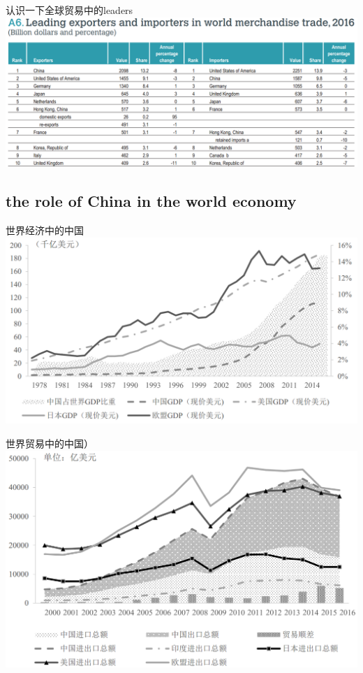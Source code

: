 \documentclass[10pt,hyperref={CJKbookmarks=true},xcolor=dvipsnames,aspectratio=169]{beamer}
\begin{document}
\begin{frame}{认识一下全球贸易中的leaders}
\centering \includegraphics[scale=0.55]{fig/gravity/leaders}
\end{frame}



\subsection[中国在全球贸易中的角色]{the role of China in the world economy}

\begin{frame}{世界经济中的中国}
\centering \includegraphics[scale=0.55]{fig/gravity/china0}
\end{frame}

\begin{frame}{世界贸易中的中国）}
\centering \includegraphics[scale=0.5]{fig/gravity/china1}
\end{frame}
\end{document}
